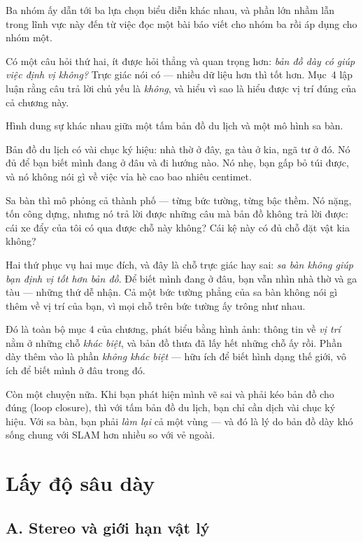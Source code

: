 \documentclass[../../vslam.tex]{subfiles}
\begin{document}
Ba nhóm ấy dẫn tới ba lựa chọn biểu diễn khác nhau, và phần lớn nhầm lẫn trong lĩnh vực này đến từ việc đọc một bài báo viết cho nhóm ba rồi áp dụng cho nhóm một.

Có một câu hỏi thứ hai, ít được hỏi thẳng và quan trọng hơn: \emph{bản đồ dày có giúp việc định vị không?} Trực giác nói có --- nhiều dữ liệu hơn thì tốt hơn. Mục~4 lập luận rằng câu trả lời chủ yếu là \emph{không}, và hiểu vì sao là hiểu được vị trí đúng của cả chương này.

\begin{trucgiac}
Hình dung sự khác nhau giữa một tấm bản đồ du lịch và một mô hình sa bàn.

Bản đồ du lịch có vài chục ký hiệu: nhà thờ ở đây, ga tàu ở kia, ngã tư ở đó. Nó đủ để bạn biết mình đang ở đâu và đi hướng nào. Nó nhẹ, bạn gấp bỏ túi được, và nó không nói gì về việc vỉa hè cao bao nhiêu centimet.

Sa bàn thì mô phỏng cả thành phố --- từng bức tường, từng bậc thềm. Nó nặng, tốn công dựng, nhưng nó trả lời được những câu mà bản đồ không trả lời được: cái xe đẩy của tôi có qua được chỗ này không? Cái kệ này có đủ chỗ đặt vật kia không?

Hai thứ phục vụ hai mục đích, và đây là chỗ trực giác hay sai: \emph{sa bàn không giúp bạn định vị tốt hơn bản đồ}. Để biết mình đang ở đâu, bạn vẫn nhìn nhà thờ và ga tàu --- những thứ dễ nhận. Cả một bức tường phẳng của sa bàn không nói gì thêm về vị trí của bạn, vì mọi chỗ trên bức tường ấy trông như nhau.

Đó là toàn bộ mục 4 của chương, phát biểu bằng hình ảnh: thông tin về \emph{vị trí} nằm ở những chỗ \emph{khác biệt}, và bản đồ thưa đã lấy hết những chỗ ấy rồi. Phần dày thêm vào là phần \emph{không khác biệt} --- hữu ích để biết hình dạng thế giới, vô ích để biết mình ở đâu trong đó.

Còn một chuyện nữa. Khi bạn phát hiện mình vẽ sai và phải kéo bản đồ cho đúng (loop closure), thì với tấm bản đồ du lịch, bạn chỉ cần dịch vài chục ký hiệu. Với sa bàn, bạn phải \emph{làm lại} cả một vùng --- và đó là lý do bản đồ dày khó sống chung với SLAM hơn nhiều so với vẻ ngoài.
\end{trucgiac}

\section{Lấy độ sâu dày}

\subsection{A. Stereo và giới hạn vật lý}
\end{document}
